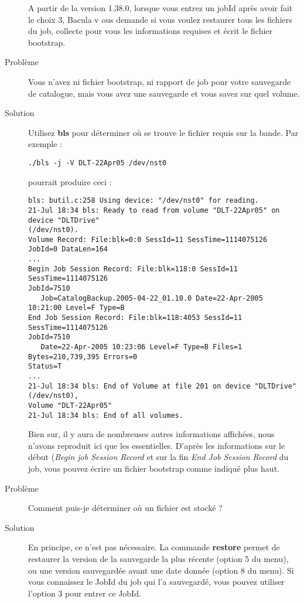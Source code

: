 \begin{description}
   A partir de la version 1.38.0, lorsque vous entrez un jobId apr\`es avoir 
   fait le choix 3, Bacula v ous demande si vous voulez restaurer tous les 
   fichiers du job, collecte pour vous les informations requises et \'ecrit le 
   fichier bootstrap.

\item [Probl\`eme]
  Vous n'avez ni fichier bootstrap, ni rapport de job pour votre sauvegarde 
  de catalogue, mais vous avez une sauvegarde et vous savez sur quel volume.
  
\item [Solution]
  Utilisez {\bf bls} pour d\'eterminer o\`u se trouve le fichier requis sur la bande. 
  Par exemple :

\footnotesize
\begin{verbatim}
./bls -j -V DLT-22Apr05 /dev/nst0
\end{verbatim}
\normalsize
  pourrait produire ceci :
\footnotesize
\begin{verbatim}
bls: butil.c:258 Using device: "/dev/nst0" for reading.
21-Jul 18:34 bls: Ready to read from volume "DLT-22Apr05" on device "DLTDrive"
(/dev/nst0).
Volume Record: File:blk=0:0 SessId=11 SessTime=1114075126 JobId=0 DataLen=164
...
Begin Job Session Record: File:blk=118:0 SessId=11 SessTime=1114075126
JobId=7510
   Job=CatalogBackup.2005-04-22_01.10.0 Date=22-Apr-2005 10:21:00 Level=F Type=B
End Job Session Record: File:blk=118:4053 SessId=11 SessTime=1114075126
JobId=7510
   Date=22-Apr-2005 10:23:06 Level=F Type=B Files=1 Bytes=210,739,395 Errors=0
Status=T
...
21-Jul 18:34 bls: End of Volume at file 201 on device "DLTDrive" (/dev/nst0),
Volume "DLT-22Apr05"
21-Jul 18:34 bls: End of all volumes.
\end{verbatim}
\normalsize
  Bien sur, il y aura de nombreuses autres informations affich\'ees, nous n'avons 
  reproduit ici que les essentielles. D'apr\`es les informations sur le d\'ebut 
  ({\it Begin job Session Record} et sur la fin {\it End Job Session Record} du 
  job, vous pouvez \'ecrire un fichier bootstrap comme indiqu\'e plus haut.

\item[Probl\`eme]
  Comment puis-je d\'eterminer o\`u un fichier est stock\'e ?
\item[Solution]
  En principe, ce n'est pas n\'ecessaire. La commande {\bf restore} permet de 
  restaurer la version de la sauvegarde la plus r\'ecente (option 5 du menu), 
  ou une version sauvegard\'ee avant une date donn\'ee (option 8 du menu). Si vous 
  connaissez le JobId du job qui l'a sauvegard\'e, vous pouvez utiliser l'option 3 
  pour entrer ce JobId.


\end{description}
